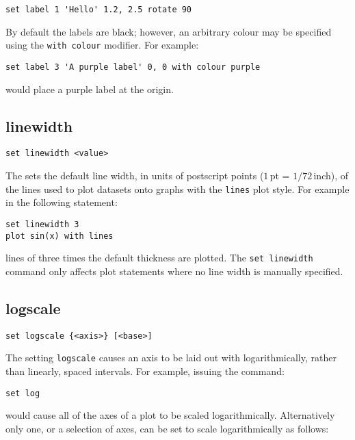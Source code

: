 \begin{verbatim}
set label 1 'Hello' 1.2, 2.5 rotate 90
\end{verbatim}

By default the labels are black; however, an arbitrary colour may be specified
using the {\tt with colour} modifier.  For example:

\begin{verbatim}
set label 3 'A purple label' 0, 0 with colour purple
\end{verbatim}

\noindent would place a purple label at the origin.


\subsection{linewidth}

\begin{verbatim}
set linewidth <value>
\end{verbatim}

The  sets the default line width, in units of postscript
points ($1$\,pt = $1/72$\,inch), of the lines used to plot datasets onto graphs
with the {\tt lines} plot style.  For example in the following statement:

\begin{verbatim}
set linewidth 3
plot sin(x) with lines
\end{verbatim}

\noindent lines of three times the default thickness are plotted.  The
{\tt set linewidth} command only affects plot statements where no line width is
manually specified.


\subsection{logscale}

\begin{verbatim}
set logscale {<axis>} [<base>]
\end{verbatim}

The setting {\tt logscale} causes an axis to be laid out with logarithmically,
rather than linearly, spaced intervals.  For example, issuing the command:

\begin{verbatim}
set log
\end{verbatim}

\noindent would cause all of the axes of a plot to be scaled logarithmically.
Alternatively only one, or a selection of axes, can be set to scale
logarithmically as follows:

